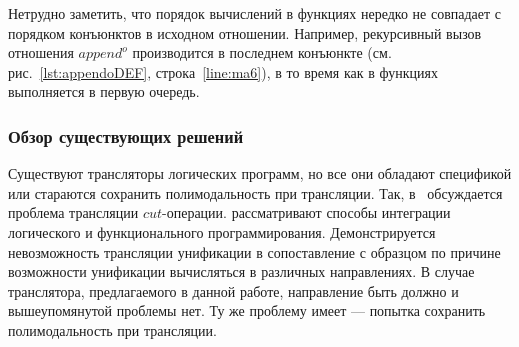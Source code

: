 Нетрудно заметить, что порядок вычислений в функциях нередко не совпадает с порядком конъюнктов в исходном отношении. 
Например, рекурсивный вызов отношения $append^o$ производится в последнем конъюнкте (см. рис.~\ref{lst:appendoDEF}, строка~\ref{line:ma6}), в то время как в функциях выполняется в первую очередь.

\subsubsection{Обзор существующих решений}

Существуют трансляторы логических программ, но все они обладают спецификой \prolog{} или стараются сохранить полимодальность при трансляции.
Так, в~\cite{Matsushita1997FCO} обсуждается проблема трансляции $cut$-операции.
\cite{Bellia1986TRB} рассматривают способы интеграции логического и функционального программирования.
Демонстрируется невозможность трансляции унификации в сопоставление с образцом по причине возможности унификации вычисляться в различных направлениях.
В случае транслятора, предлагаемого в данной работе, направление быть должно и вышеупомянутой проблемы нет.
Ту же проблему имеет \cite{marchiori1995the} --- попытка сохранить полимодальность при трансляции.
